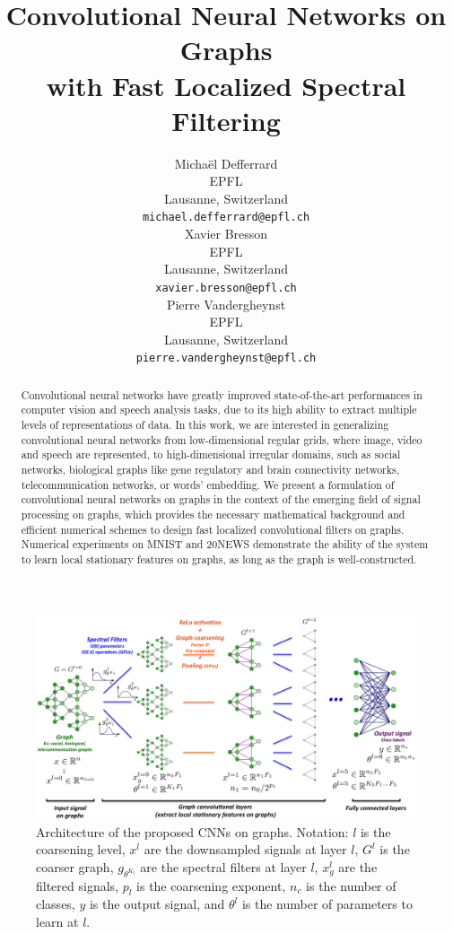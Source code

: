 \documentclass{article}
\title{Convolutional Neural Networks on Graphs\\ with Fast Localized Spectral Filtering}
\author{
  Michaël Defferrard \\ %
  EPFL \\
  Lausanne, Switzerland \\
  \texttt{michael.defferrard@epfl.ch} \\
  \And %
  Xavier Bresson \\
  EPFL \\
  Lausanne, Switzerland \\
  \texttt{xavier.bresson@epfl.ch} \\
  \And
  Pierre Vandergheynst \\
  EPFL \\
  Lausanne, Switzerland \\
  \texttt{pierre.vandergheynst@epfl.ch} \\
}
\begin{document}

\maketitle



\begin{abstract}
Convolutional neural networks have greatly improved state-of-the-art performances in computer vision and speech analysis tasks, due to its high ability to extract multiple levels of representations of data. In this work, we are interested in generalizing convolutional neural networks from low-dimensional regular grids, where image, video and speech are represented, to high-dimensional irregular domains, such as social networks, biological graphs like gene regulatory and brain connectivity networks, telecommunication networks, or words' embedding. We present a formulation of convolutional neural networks on graphs in the context of the emerging field of signal processing on graphs, which provides the necessary mathematical background and efficient numerical schemes to design fast localized convolutional filters on graphs. Numerical experiments on MNIST and 20NEWS demonstrate the ability of the system to learn local stationary features on graphs, as long as the graph is well-constructed.
\end{abstract}





\begin{figure}[h!]
\centering
\includegraphics[width=13.5cm]{images/illustrationCNNgraphs.eps}
\caption{Architecture of the proposed CNNs on graphs. Notation: $l$ is the coarsening level, $x^l$ are the downsampled signals at layer $l$, $G^l$ is the coarser graph, $g_{\theta^{K_l}}$ are the spectral filters at layer $l$, $x_g^l$ are the filtered signals, $p_l$ is the coarsening exponent, $n_c$ is the number of classes, $y$ is the output signal, and $\theta^l$ is the number of parameters to learn at $l$.}
\label{fig:}
\end{figure}
\end{document}
